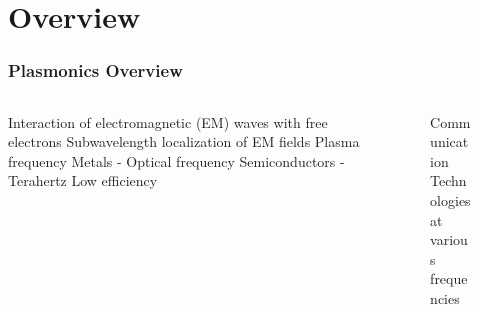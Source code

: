 \documentclass[mathserif,18pt,xcolor=table,c]{beamer}
\begin{document}
\section{Overview}
\begin{frame}
  \frametitle{Plasmonics Overview}
  \begin{columns} %
    \begin{column}{.5\textwidth}
      \begin{outline}[itemize]
        \1 Interaction of electromagnetic (EM) waves with free electrons
        \1 Subwavelength localization of EM fields
        \1 Plasma frequency
          \2 Metals - Optical frequency
          \2 Semiconductors - Terahertz
        \1 Low efficiency
      \end{outline}
    \end{column}
    \begin{column}{.5\textwidth}
      \begin{figure}
        \hspace*{-1cm}
        \def\svgwidth{1.2\linewidth}
        
        \caption{Communication Technologies at various frequencies}
      \end{figure}
      \end{column}%
    \end{columns}
  \end{frame}
\end{document}
